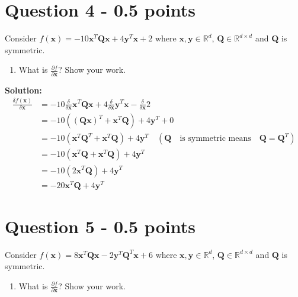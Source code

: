 \documentclass[11pt]{article}
\begin{document}
\section*{Question 4 - 0.5 points}
Consider $f(\mathbf{x}) = -10\mathbf{x}^T\mathbf{Q}\mathbf{x} + 4\mathbf{y}^T\mathbf{x} + 2$ where $\mathbf{x}, \mathbf{y} \in \mathbb{R}^d$, $\mathbf{Q} \in \mathbb{R}^{d\times d}$ and $\mathbf{Q}$ is symmetric.
 \begin{enumerate} 
\item What is $\frac{\partial f}{\partial\mathbf{x}}$?  Show your work. 
\end{enumerate}

\textbf{Solution:}
\begin{align*}
\frac{\delta f(\mathbf{x})}{\delta \mathbf{x}} &= -10\frac{\delta}{\delta \mathbf{x}} \mathbf{x}^T\mathbf{Q}\mathbf{x}  + 4 \frac{\delta}{\delta \mathbf{x}} \mathbf{y}^T\mathbf{x} - \frac{\delta}{\delta \mathbf{x}} 2 \\
&= -10((\mathbf{Q}\mathbf{x})^T + \mathbf{x}^T\mathbf{Q})  + 4 \mathbf{y}^T + 0 \\
&= -10(\mathbf{x}^T\mathbf{Q}^T + \mathbf{x}^T\mathbf{Q})  + 4 \mathbf{y}^T \quad (\mathbf{Q}\quad\textrm{is symmetric means} \quad \mathbf{Q} = \mathbf{Q}^T )\\
&= -10(\mathbf{x}^T\mathbf{Q} + \mathbf{x}^T\mathbf{Q})  + 4 \mathbf{y}^T\\
&= -10(2\mathbf{x}^T\mathbf{Q})  + 4 \mathbf{y}^T\\
&= -20\mathbf{x}^T\mathbf{Q}  + 4 \mathbf{y}^T
\end{align*}

\section*{Question 5 - 0.5 points}
Consider $f(\mathbf{x}) = 8\mathbf{x}^T\mathbf{Q}\mathbf{x} - 2\mathbf{y}^T\mathbf{Q}^T\mathbf{x} + 6$ where $\mathbf{x}, \mathbf{y} \in \mathbb{R}^d$, $\mathbf{Q} \in \mathbb{R}^{d\times d}$ and $\mathbf{Q}$ is symmetric.
\begin{enumerate} 
\item What is $\frac{\partial f}{\partial\mathbf{x}}$?  Show your work.
\end{enumerate}
\end{document}
